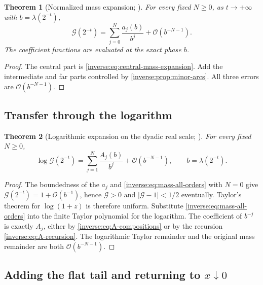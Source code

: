 \documentclass[11pt,oneside]{article}
\newtheorem{theorem}{Theorem}[section]
\theoremstyle{definition}
\theoremstyle{remark}
\newcommand{\bigO}{\mathcal O}
\begin{document}
\begin{theorem}[Normalized mass expansion; \Formalized]
\label{inverse:thm:mass-all-orders}
For every fixed $N\geq0$, as $t\to+\infty$ with
$b=\lambda(2^{-t})$,
\begin{equation}
 \mathcal G(2^{-t})
 =\sum_{j=0}^{N}\frac{a_j(b)}{b^j}
  +\bigO(b^{-N-1}). \label{inverse:eq:mass-all-orders}
\end{equation}
The coefficient functions are evaluated at the exact phase $b$.
\end{theorem}

\begin{proof}
The central part is \eqref{inverse:eq:central-mass-expansion}.  Add the
intermediate and far parts controlled by \cref{inverse:prop:minor-arcs}.  All
three errors are $\bigO(b^{-N-1})$.
\end{proof}

\subsection{Transfer through the logarithm}

\begin{theorem}[Logarithmic expansion on the dyadic real scale;
\Formalized]
\label{inverse:thm:log-dyadic-all-orders}
For every fixed $N\geq0$,
\begin{equation}
 \log\mathcal G(2^{-t})
 =\sum_{j=1}^{N}\frac{A_j(b)}{b^j}
  +\bigO(b^{-N-1}),
 \qquad b=\lambda(2^{-t}). \label{inverse:eq:log-mass-all-orders}
\end{equation}
\end{theorem}

\begin{proof}
The boundedness of the $a_j$ and \eqref{inverse:eq:mass-all-orders} with $N=0$
give $\mathcal G(2^{-t})=1+\bigO(b^{-1})$, hence
$\mathcal G>0$ and $|\mathcal G-1|<1/2$ eventually.  Taylor's theorem for
$\log(1+z)$ is therefore uniform.  Substitute
\eqref{inverse:eq:mass-all-orders} into the finite Taylor polynomial for the
logarithm.  The coefficient of $b^{-j}$ is exactly $A_j$, either by
\eqref{inverse:eq:A-compositions} or by the recursion
\eqref{inverse:eq:A-recursion}.  The logarithmic Taylor remainder and the
original mass remainder are both $\bigO(b^{-N-1})$.
\end{proof}

\subsection{Adding the flat tail and returning to \texorpdfstring{\(x\downarrow0\)}{x to 0}}
\end{document}
